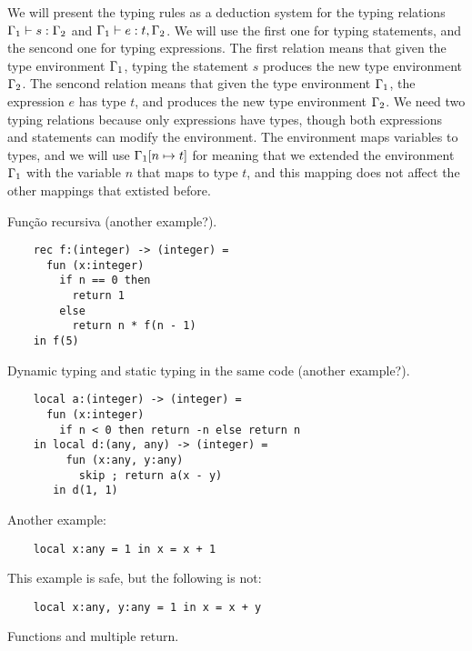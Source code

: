 We will present the typing rules as a deduction system for the typing
relations $\Gamma_{1} \vdash s : \Gamma_{2}$ and $\Gamma_{1} \vdash e : t, \Gamma_{2}$. 
We will use the first one for typing statements, and the sencond one
for typing expressions. 
The first relation means that given the type environment $\Gamma_{1}$,
typing the statement $s$ produces the new type environment $\Gamma_{2}$. 
The sencond relation means that given the type environment $\Gamma_{1}$,
the expression $e$ has type $t$, and produces the new type environment $\Gamma_{2}$.
We need two typing relations because only expressions have types,
though both expressions and statements can modify the environment.
The environment maps variables to types, and we will use $\Gamma_{1}[n \mapsto t]$
for meaning that we extended the environment $\Gamma_{1}$ with the
variable $n$ that maps to type $t$, and this mapping does not affect
the other mappings that extisted before.

Função recursiva (another example?).

\begin{verbatim}
    rec f:(integer) -> (integer) =
      fun (x:integer)
        if n == 0 then
          return 1
        else
          return n * f(n - 1)
    in f(5)
\end{verbatim}

Dynamic typing and static typing in the same code (another example?).

\begin{verbatim}
    local a:(integer) -> (integer) =
      fun (x:integer)
        if n < 0 then return -n else return n
    in local d:(any, any) -> (integer) =
         fun (x:any, y:any)
           skip ; return a(x - y)
       in d(1, 1)
\end{verbatim}

Another example:

\begin{verbatim}
    local x:any = 1 in x = x + 1
\end{verbatim}

This example is safe, but the following is not:

\begin{verbatim}
    local x:any, y:any = 1 in x = x + y
\end{verbatim}

Functions and multiple return.

